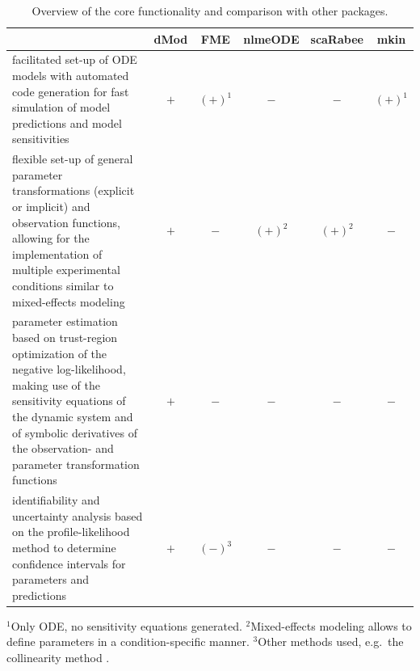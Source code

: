 \documentclass[article]{jss}
\begin{document}
\begin{table}[ht]
	\caption{Overview of the  core functionality and comparison with other packages.}
	\label{tab:comparison}
	\begin{scriptsize}
		\begin{center}
			\begin{tabular}{m{7cm}||c|c|c|c|c}
				& dMod & FME & nlmeODE & scaRabee & mkin\\
				\hline
				\hline
				facilitated set-up of ODE models with automated \proglang{C} code generation for fast simulation of model predictions and model sensitivities & $+$ & $(+)^1$ & $-$ & $-$ & $(+)^1$ \\
				\hline
				flexible set-up of general parameter transformations (explicit or implicit) and observation functions, allowing for the implementation of multiple experimental conditions similar to mixed-effects modeling & $+$ & $-$ & $(+)^2$ & $(+)^2$ & $-$ \\
				\hline
				parameter estimation based on trust-region optimization of the negative log-likelihood, making use of the sensitivity equations of the dynamic system and of symbolic derivatives of the observation- and parameter transformation functions & $+$ & $-$ & $-$ & $-$ & $-$ \\
				\hline
				identifiability and uncertainty analysis based on the profile-likelihood method to determine confidence intervals for parameters and predictions & $+$ & $(-)^3$ & $-$ & $-$ & $-$ \\
				\hline
			\end{tabular}
		\end{center}
	\end{scriptsize}
	\vspace{0.1em}

	\begin{scriptsize}
		$^1$Only ODE, no sensitivity equations generated. $^2$Mixed-effects modeling allows to define parameters in a condition-specific manner. $^3$Other methods used, e.g.~the collinearity method \citep{brun2001practical}. 
	\end{scriptsize}
\end{table}

\end{document}

